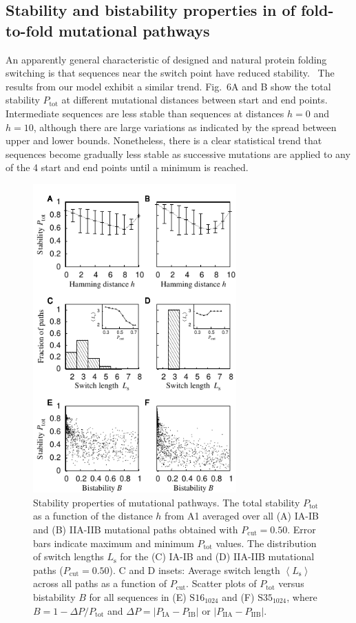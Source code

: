 \documentclass[
aip,
rsi,%
amsmath,amssymb,
reprint,%
]{revtex4-1}
\newcommand {\Pcut}     	{{P_\mathrm{cut}}}
\newcommand {\Ptot}	{{P_\mathrm{tot}}}
\newcommand {\PIA}    	{{P_\mathrm{IA}}}
\newcommand {\PIB}    	{{P_\mathrm{IB}}}
\newcommand {\PIIA}    	{{P_\mathrm{IIA}}}
\newcommand {\PIIB}    	{{P_\mathrm{IIB}}}
\newcommand {\SI}		{${\mathrm{S16}_{1024}}$}
\newcommand {\SII}		{${\mathrm{S35}_{1024}}$}
\begin{document}
\subsection{Stability and bistability properties in of fold-to-fold mutational pathways}
\noindent 
An apparently general characteristic of designed and natural protein folding switching is that sequences near the switch point have reduced stability.~\cite{Bryan2010} The results from our model exhibit a similar trend. Fig.~6A and B show the total stability $\Ptot$ at different mutational distances between start and end points. Intermediate sequences are less stable than sequences at distances $h=0$ and $h=10$, although there are large variations as indicated by the spread between upper and lower bounds. Nonetheless, there is a clear statistical trend that sequences become gradually less stable as successive mutations are applied to any of the 4 start and end points until a minimum is reached. 

\begin{figure}
\includegraphics[width=7.8cm]{Paths}
\caption{Stability properties of mutational pathways. The total stability $\Ptot$ as a function of the distance $h$ from A1 averaged over all (A) IA-IB and (B) IIA-IIB mutational paths obtained with $\Pcut=0.50$. Error bars indicate maximum and minimum $\Ptot$ values. The distribution of switch lengths $L_\mathrm{s}$ for the (C) IA-IB and (D) IIA-IIB mutational paths ($\Pcut=0.50$). C and D insets: Average switch length $\left < L_\mathrm{s}\right >$ across all paths as a function of $\Pcut$. Scatter plots of $\Ptot$ versus bistability $B$ for all sequences in (E) {\SI} and (F) {\SII}, where $B=1-\Delta P/\Ptot$ and $\Delta P = |\PIA-\PIB|$ or $|\PIIA-\PIIB|$.}
\end{figure}
\end{document}
